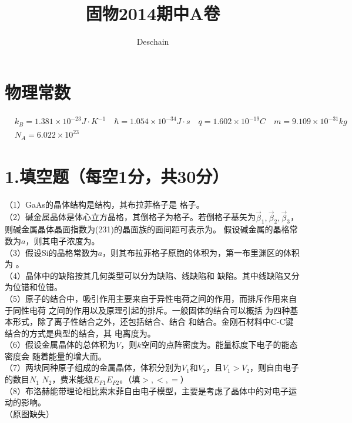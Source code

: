 \documentclass[UTF8]{ctexart}
\title{固物2014期中A卷}
\author{Deschain}
\begin{document}
\maketitle
\section*{\bfseries 物理常数}
\begin{equation*}
    \begin{aligned}
        & k_B=1.381\times10^{-23}J\cdot K^{-1}\quad\hbar=1.054\times10^{-34}J\cdot s\quad 
        q=1.602\times10^{-19}C\quad m=9.109\times10^{-31}kg\\
        & N_A=6.022\times10^{23}
    \end{aligned}
\end{equation*}
\section*{\bfseries 1.填空题（每空1分，共30分）}
（1）GaAs的晶体结构是\underline{\makebox[4em]{}}结构，其布拉菲格子是\underline{\makebox[6em]{}}
格子。\\
（2）碱金属晶体是体心立方晶格，其倒格子为\underline{\makebox[6em]{}}格子。若倒格子基矢为$\vec\beta_1,
\vec\beta_2,\vec\beta_3$，则碱金属晶体晶面指数为(231)的晶面族的面间距可表示为\underline{\makebox[10em]{}}。
假设碱金属的晶格常数为$a$，则其电子浓度为\underline{\makebox[2em]{}}。\\
（3）假设Si的晶格常数为$a$，则其布拉菲格子原胞的体积为\underline{\makebox[2em]{}}，第一布里渊区的体积为
\underline{\makebox[3em]{}}。\\
（4）晶体中的缺陷按其几何类型可以分为\underline{\makebox[2em]{}}缺陷、线缺陷和\underline{\makebox[2em]{}}
缺陷。其中线缺陷又分为\underline{\makebox[3em]{}}位错和\makebox[2em]{}位错。\\
（5）原子的结合中，吸引作用主要来自于异性电荷之间的\underline{\makebox[3em]{}}作用，而排斥作用来自于同性电荷
之间的\underline{\makebox[3em]{}}作用以及\underline{\makebox[7em]{}}原理引起的排斥。一般固体的结合可以概括
为四种基本形式，除了离子性结合之外，还包括\underline{\makebox[4em]{}}结合、\underline{\makebox[4em]{}}结合
和\underline{\makebox[9em]{}}结合。金刚石材料中C-C键结合的方式是典型的\underline{\makebox[3em]{}}结合，其
电离度为\underline{\makebox[2em]{}}。\\
（6）假设金属晶体的总体积为$V$，则$k$空间的点阵密度为\underline{\makebox[3em]{}}。能量标度下电子的能态密度会
随着能量的增大而\underline{\makebox[3em]{}}。\\
（7）两块同种原子组成的金属晶体，体积分别为$V_1$和$V_2$，且$V_1>V_2$，则自由电子的数目$N_1$
\underline{\makebox[2em]{}}$N_2$，费米能级$E_{F1}$\underline{\makebox[2em]{}}$E_{F2}$。（填$>,<,=$）\\
（8）布洛赫能带理论相比索末菲自由电子模型，主要是考虑了晶体中的\underline{\makebox[7em]{}}对电子运动的影响。\\
（原图缺失）\\
\end{document}
